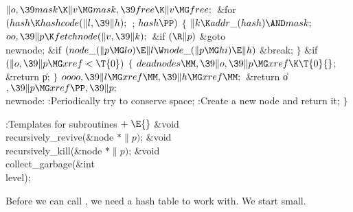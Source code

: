 ${}\|o,\39\\{mask}\K\|v\MG\\{mask},\39\\{free}\K\|v\MG\\{free};{}$\6
\&{for} ${}(\\{hash}\K\\{hashcode}(\|l,\39\|h);{}$  ; ${}\\{hash}\PP){}$\5
${}\{{}$\1\6
${}\|k\K\\{addr\_}(\\{hash})\AND\\{mask};{}$\6
${}\\{oo},\39\|p\K\\{fetchnode}(\|v,\39\|k);{}$\6
\&{if} ${}(\R\|p){}$\1\5
\&{goto} \\{newnode};\2\6
\&{if} ${}(\\{node\_}(\|p\MG\\{lo})\E\|l\W\\{node\_}(\|p\MG\\{hi})\E\|h){}$\1\5
\&{break};\2\6
\4${}\}{}$\2\6
\&{if} ${}(\|o,\39\|p\MG\\{xref}<\T{0}){}$\5
${}\{{}$\1\6
${}\\{deadnodes}\MM,\39\|o,\39\|p\MG\\{xref}\K\T{0}{}$;\6
\&{return} \|p;\6
\4${}\}{}$\2\6
${}\\{oooo},\39\|l\MG\\{xref}\MM,\39\|h\MG\\{xref}\MM;{}$\6
\&{return} \|o${},\39\|p\MG\\{xref}\PP,\39\|p;{}$\6
\4\\{newnode}:\5
:Periodically try to conserve space\X;\6
:Create a new node and return it\X;\6
\4${}\}{}$\2\par
\fi

\B{}:Templates for subroutines\X${}\mathrel+\E{}$\6
\&{void} \\{recursively\_revive}(\&{node} ${}{*}\|p){}$;\6
\&{void} \\{recursively\_kill}(\&{node} ${}{*}\|p){}$;\6
\&{void} \\{collect\_garbage}(\&{int} \\{level});\par
\fi

Before we can call , we need a hash table to work
with.
We start small.

